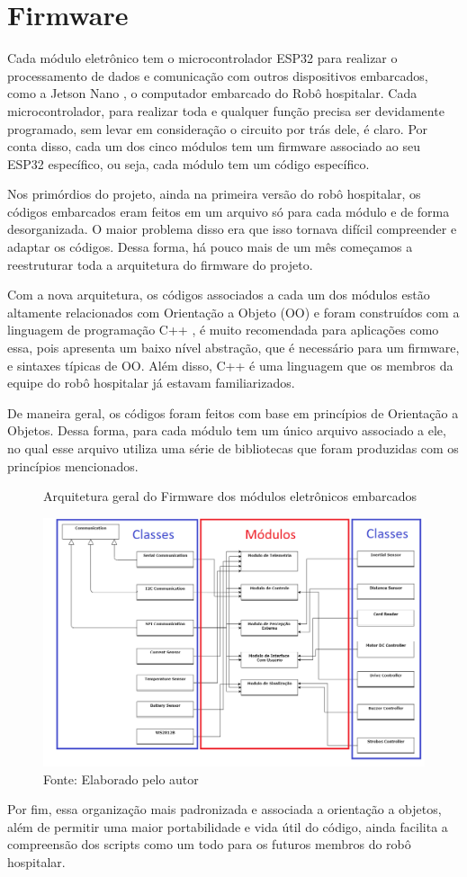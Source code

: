 \documentclass[../delivery_hospital_report.tex]{subfiles}
\begin{document}
\clearpage
\section{Firmware}

Cada módulo eletrônico tem o microcontrolador ESP32 \cite{esp32} para realizar o processamento de dados e comunicação com outros dispositivos embarcados, como a Jetson Nano \cite{jetson21}, o computador embarcado do Robô hospitalar. Cada microcontrolador, para realizar toda e qualquer função precisa ser devidamente programado, sem levar em consideração o circuito por trás dele, é claro. Por conta disso, cada um dos cinco módulos tem um firmware associado ao seu ESP32 específico, ou seja, cada módulo tem um código específico.

Nos primórdios do projeto, ainda na primeira versão do robô hospitalar, os códigos embarcados eram feitos em um arquivo só para cada módulo e de forma desorganizada. O maior problema disso era que isso tornava difícil compreender e adaptar os códigos. Dessa forma, há pouco mais de um mês começamos a reestruturar toda a arquitetura do firmware do projeto.

Com a nova arquitetura, os códigos associados a cada um dos módulos estão altamente relacionados com Orientação a Objeto (OO) e foram construídos com a linguagem de programação C++ \cite{c++21}, é muito recomendada para aplicações como essa, pois apresenta um baixo nível abstração, que é necessário para um firmware, e sintaxes típicas de OO. Além disso, C++ é uma linguagem que os membros da equipe do robô hospitalar já estavam familiarizados.

De maneira geral, os códigos foram feitos com base em princípios de Orientação a Objetos. Dessa forma, para cada módulo tem um único arquivo associado a ele, no qual esse arquivo utiliza uma série de bibliotecas que foram produzidas com os princípios mencionados.

\begin{figure}[!h]
\centering
    \caption{Arquitetura geral do Firmware dos módulos eletrônicos embarcados }
    \centering %
    \includegraphics[width=17cm]{modulos/classes_firmware.png}
    \caption*{Fonte: Elaborado pelo autor }
    \label{Protótipo placa de ## - Esquemático principal}
\end{figure}

Por fim, essa organização mais padronizada e associada a orientação a objetos, além de permitir uma maior portabilidade e vida útil do código, ainda facilita a compreensão dos  scripts como um todo para os futuros membros do robô hospitalar.
\end{document}
